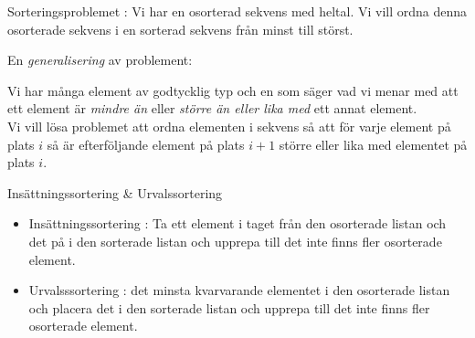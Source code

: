 



\begin{Slide}{Sorteringsproblemet}
: Vi har en osorterad sekvens med heltal. Vi vill ordna denna osorterade sekvens i en sorterad sekvens från minst till störst.
\pause

\vspace{1em}\noindent
En \emph{generalisering} av problement: \\ \vspace{1em}

\noindent Vi har många element av godtycklig typ och en  som säger vad vi menar med att ett element är \emph{mindre än} eller \emph{större än eller lika med} ett annat element. \\ 

\vspace{1em}\noindent Vi vill lösa problemet att ordna elementen i sekvens så att för varje element på plats $i$ så är efterföljande element på plats $i + 1$ större eller lika med elementet på plats $i$.

\end{Slide}

\begin{Slide}{Insättningssortering \& Urvalssortering}
\begin{itemize}
\item Insättningssortering : Ta ett element i taget från den osorterade listan och  det på  i den sorterade listan och upprepa till det inte finns fler osorterade element.
\pause
\item Urvalsssortering :  det minsta kvarvarande elementet i den osorterade listan och placera det  i den sorterade listan och upprepa till det inte finns fler osorterade element.
\end{itemize}
\end{Slide}



